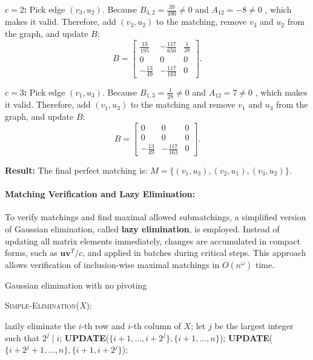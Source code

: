 \textbf{$c=2$: } Pick edge \( (v_3, u_2) \). Because \( B_{3,2} = \frac{39}{490} \neq 0 \) and \(A_{12} = -8 \neq 0 \) , which makes it valid. Therefore, add \( (v_3, u_2) \) to the matching, remove \( v_3 \) and \( u_2 \) from the graph, and update \( B \):
\[
\renewcommand{\arraystretch}{1.5}
B =
\begin{bmatrix}
\frac{13}{195} & -\frac{117}{650} & \frac{1}{28} \\
0 & 0 & 0 \\
-\frac{13}{49} & -\frac{117}{163} & 0
\end{bmatrix}.
\]

\textbf{$c=3$: } Pick edge \( (v_1, u_3) \). Because \( B_{1,3} = \frac{1}{28} \neq 0 \) and \(A_{12} = 7 \neq 0 \) , which makes it valid. Therefore, add \( (v_1, u_3) \) to the matching and remove \( v_1 \) and \( u_3 \) from the graph, and update \( B \):
\[
\renewcommand{\arraystretch}{1.5}
B =
\begin{bmatrix}
0 & 0 & 0 \\
0 & 0 & 0 \\
-\frac{13}{49} & -\frac{117}{163} & 0
\end{bmatrix}.
\]

\textbf{Result:} The final perfect matching is: $M = \{(v_1, u_3), (v_2, u_1), (v_3, u_2)\}.$


\paragraph*{Matching Verification and Lazy Elimination:}
To verify matchings and find maximal allowed submatchings, a simplified version of Gaussian elimination, called \textbf{lazy elimination}, is employed. Instead of updating all matrix elements immediately, changes are accumulated in compact forms, such as \( \mathbf{u} \mathbf{v}^T / c \), and applied in batches during critical steps. This approach allows verification of inclusion-wise maximal matchings in \( O(n^\omega) \) time.

\begin{algorithm}
\caption{Gaussian elimination with no pivoting}
\textsc{Simple-Elimination}($X$):
\begin{algorithmic}[1]
        \STATE lazily eliminate the $i$-th row and $i$-th column of $X$;
        \STATE let $j$ be the largest integer such that $2^j \mid i$;
        \STATE \textbf{UPDATE}($\{i + 1, \ldots, i + 2^j\}, \{i + 1, \ldots, n\}$);
        \STATE \textbf{UPDATE}($\{i + 2^j + 1, \ldots, n\}, \{i + 1, i + 2^j\}$);
    \ENDFOR
\end{algorithmic}
\end{algorithm}

